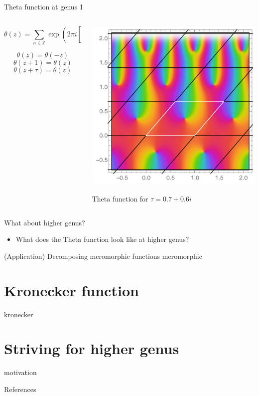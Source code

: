 \documentclass[11pt,aspectratio=169]{beamer}
\begin{document}
\begin{frame}{Theta function at genus 1}
    \begin{columns}[onlytextwidth]
        \begin{column}{0.55\textwidth}
            \[\theta(z) = \sum_{n \in \mathbb Z} \exp(2\pi i[\frac{1}{2}n^2 \tau + n z])\]

            \[\theta(z)=\theta(-z)\]
            \[\theta(z+1)=\theta(z)\]
            \[\theta(z+\tau)=\theta(z)\]
        \end{column}
        \begin{column}{0.45\textwidth}
            \center
            \includegraphics[width=0.7\columnwidth]{assets/genus1theta.png}

            \tiny Theta function for $\tau = 0.7+0.6i$

            \cite{Cha22}
        \end{column}
    \end{columns}

    {
    \begin{block}{What about higher genus?}
        \begin{itemize}
            \item What does the Theta function look like at higher genus?
        \end{itemize}
    \end{block}
    }
\end{frame}

\begin{frame}{(Application) Decomposing meromorphic functions}
    meromorphic
\end{frame}

\section{Kronecker function}

\begin{frame}
    kronecker
\end{frame}

\section{Striving for higher genus}

\begin{frame}
    motivation
\end{frame}

\begin{frame}{References}
    \printbibliography{}
\end{frame}
\end{document}
